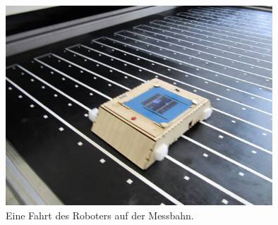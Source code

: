 \documentclass[a4paper,bibtotoc,oneside]{scrbook}
\begin{document}
\begin{figure}[htbp]
\centering
\includegraphics[width=100mm]{img/robofahrt.jpg}
\caption{Eine Fahrt des Roboters auf der Messbahn.}\label{robofahrt}
\end{figure}
\end{document}

